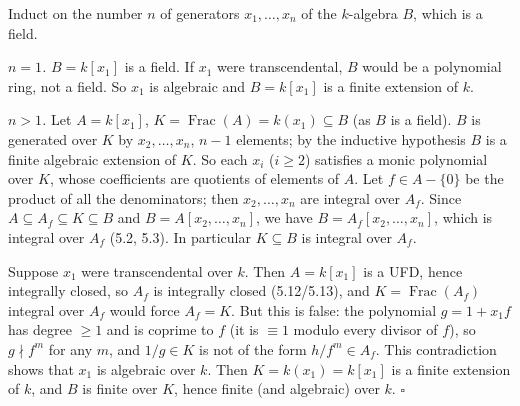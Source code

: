 \documentclass[11pt]{article}
\begin{document}
\pf
Induct on the number $n$ of generators $x_1,\dots,x_n$ of the $k$-algebra $B$, which is a field.

\emph{$n=1$.} $B=k[x_1]$ is a field. If $x_1$ were transcendental, $B$ would be a polynomial ring, not a field. So $x_1$ is algebraic and $B=k[x_1]$ is a finite extension of $k$.

\emph{$n>1$.} Let $A=k[x_1]$, $K=\operatorname{Frac}(A)=k(x_1)\subseteq B$ (as $B$ is a field). $B$ is generated over $K$ by $x_2,\dots,x_n$, $n-1$ elements; by the inductive hypothesis $B$ is a finite algebraic extension of $K$. So each $x_i$ ($i\ge2$) satisfies a monic polynomial over $K$, whose coefficients are quotients of elements of $A$. Let $f\in A-\{0\}$ be the product of all the denominators; then $x_2,\dots,x_n$ are integral over $A_f$. Since $A\subseteq A_f\subseteq K\subseteq B$ and $B=A[x_2,\dots,x_n]$, we have $B=A_f[x_2,\dots,x_n]$, which is integral over $A_f$ (5.2, 5.3). In particular $K\subseteq B$ is integral over $A_f$.

Suppose $x_1$ were transcendental over $k$. Then $A=k[x_1]$ is a UFD, hence integrally closed, so $A_f$ is integrally closed (5.12/5.13), and $K=\operatorname{Frac}(A_f)$ integral over $A_f$ would force $A_f=K$. But this is false: the polynomial $g=1+x_1f$ has degree $\ge1$ and is coprime to $f$ (it is $\equiv1$ modulo every divisor of $f$), so $g\nmid f^m$ for any $m$, and $1/g\in K$ is not of the form $h/f^m\in A_f$. This contradiction shows that $x_1$ is algebraic over $k$. Then $K=k(x_1)=k[x_1]$ is a finite extension of $k$, and $B$ is finite over $K$, hence finite (and algebraic) over $k$. \hfill$\square$
\end{document}
